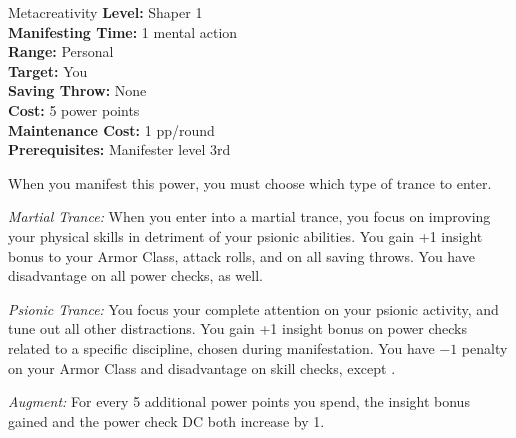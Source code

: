 {Metacreativity}
{
    \textbf{Level:}
    Shaper 1\\
    \textbf{Manifesting Time:}
    1 mental action\\
    \textbf{Range:}
    Personal\\
    \textbf{Target:}
    You\\
    \textbf{Saving Throw:}
    None\\
    \textbf{Cost:}
    5 power points\\
    \textbf{Maintenance Cost:}
    1 pp/round\\
    \textbf{Prerequisites:}
    Manifester level 3rd\\
}
{
    When you manifest this power, you must choose which type of trance to enter.

    \begin{itemize*}
    \item \textit{Martial Trance:} When you enter into a martial trance, you focus on improving your physical skills in detriment of your psionic abilities. You gain +1 insight bonus to your Armor Class, attack rolls, and on all saving throws. You have disadvantage on all power checks, as well.
    \item \textit{Psionic Trance:} You focus your complete attention on your psionic activity, and tune out all other distractions. You gain +1 insight bonus on power checks related to a specific discipline, chosen during manifestation. You have $-1$ penalty on your Armor Class and disadvantage on skill checks, except .
    \end{itemize*}

    \textit{Augment:} For every 5 additional power points you spend, the insight bonus gained and the power check DC both increase by 1.
}
